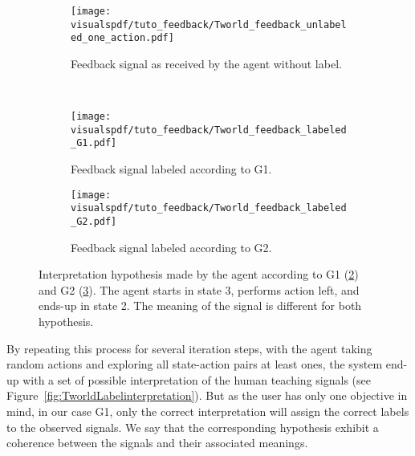 \begin{figure}[!htbp]
    \centering
    \begin{subfigure}[b]{\tworldsize\columnwidth}
        \centering
        \texttt{[image: \\visualspdf/tuto\_feedback/Tworld\_feedback\_unlabeled\_one\_action.pdf]}
        \caption{Feedback signal as received by the agent without label.}
        \label{fig:TworldLabelunknown}
    \end{subfigure}\\
    \begin{subfigure}[b]{\tworldsize\columnwidth}
        \centering
        \texttt{[image: \\visualspdf/tuto\_feedback/Tworld\_feedback\_labeled\_G1.pdf]}
        \caption{Feedback signal labeled according to G1.}
        \label{fig:TworldLabelG1}
    \end{subfigure}
    \begin{subfigure}[b]{\tworldsize\columnwidth}
        \centering
        \texttt{[image: \\visualspdf/tuto\_feedback/Tworld\_feedback\_labeled\_G2.pdf]}
        \caption{Feedback signal labeled according to G2.}
        \label{fig:TworldLabelG2}
    \end{subfigure}
    \caption{Interpretation hypothesis made by the agent according to G1 (\ref{fig:TworldLabelG1}) and G2 (\ref{fig:TworldLabelG2}). The agent starts in state 3, performs action left, and ends-up in state 2. The meaning of the signal is different for both hypothesis.}
    \label{fig:TworldLabelOneStep}
\end{figure}

By repeating this process for several iteration steps, with the agent taking random actions and exploring all state-action pairs at least ones, the system end-up with a set of possible interpretation of the human teaching signals (see Figure~\ref{fig:TworldLabelinterpretation}). But as the user has only one objective in mind, in our case G1, only the correct interpretation will assign the correct labels to the observed signals. We say that the corresponding hypothesis exhibit a coherence between the signals and their associated meanings. 


        
